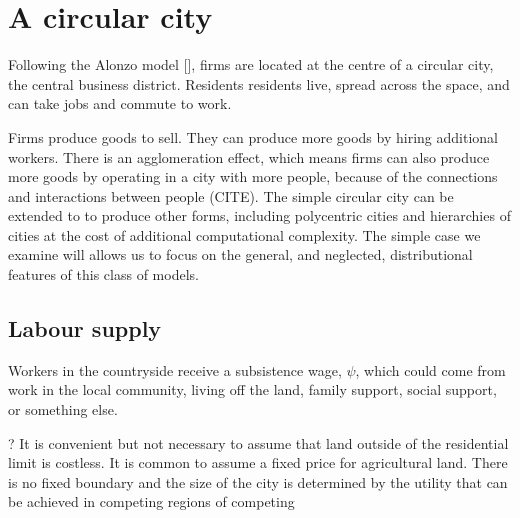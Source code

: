 \section{A circular city}

Following the Alonzo model [], firms are located at the centre of a circular city, the central business district. Residents residents live, spread across the space, and can take jobs and commute to work.

Firms produce goods to sell. They can produce more goods by hiring additional workers. 
There is an agglomeration effect, which means firms can also produce more goods by operating in a city with more people, because of the connections and interactions between people (CITE). 
The simple circular city can be extended to to produce other forms, including polycentric cities and hierarchies of cities at the cost of additional computational complexity. The simple case we examine will allows us to focus on the general, and neglected, distributional features of this class of models.

\subsection{Labour supply}


Workers in the countryside receive a subsistence wage, $\psi$, which could come from work in the local community, living off the land, family support, social support, or something else. %




? It is convenient but not necessary to assume that land outside of the residential limit is costless. It is common to assume a fixed price for agricultural land. There is no fixed boundary and the size of the city is determined by the utility that can be achieved in competing regions of competing


